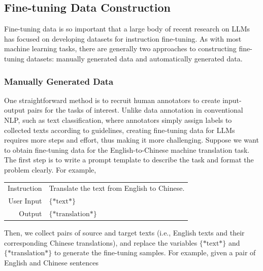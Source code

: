 \vspace{0.5em}

\subsection{Fine-tuning Data Construction}

\noindent Fine-tuning data is so important that a large body of recent research on LLMs has focused on developing datasets for instruction fine-tuning. As with most machine learning tasks, there are generally two approaches to constructing fine-tuning datasets: manually generated data and automatically generated data.

\subsubsection{Manually Generated Data}

\noindent One straightforward method is to recruit human annotators to create input-output pairs for the tasks of interest. Unlike data annotation in conventional NLP, such as text classification, where annotators simply assign labels to collected texts according to guidelines, creating fine-tuning data for LLMs requires more steps and effort, thus making it more challenging. Suppose we want to obtain fine-tuning data for the English-to-Chinese machine translation task. The first step is to write a prompt template to describe the task and format the problem clearly. For example,

\vspace{0.5em}
\begin{tcolorbox}

\begingroup
\renewcommand{\arraystretch}{1.0}
\setlength{\tabcolsep}{6pt}
\begin{tabular}{r l}
{\color{gray} \small{Instruction}} & Translate the text from English to Chinese. \\ [0.2cm]
{\color{gray} \small{User Input}} & $\{*\mathrm{text}*\}$  \\ [0.2cm]
{\color{gray} \small{Output}} & \underline{$\{*\mathrm{translation}*\}$}
\end{tabular}
\endgroup

\end{tcolorbox}
\vspace{0.5em}

Then, we collect pairs of source and target texts (i.e., English texts and their corresponding Chinese translations), and replace the variables $\{*\mathrm{text}*\}$ and $\{*\mathrm{translation}*\}$ to generate the fine-tuning samples. For example, given a pair of English and Chinese sentences

